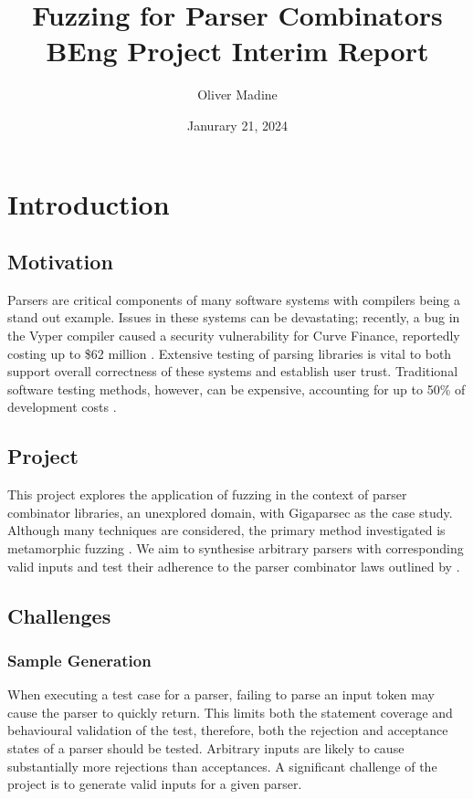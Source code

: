 \documentclass[11pt]{article}
\title{Fuzzing for Parser Combinators \\ {\large BEng Project Interim Report}}
\author{Oliver Madine}
\date{Janurary 21, 2024}
\let\oldciteauthor\citeauthor
\renewcommand{\citeauthor}[1]{\oldciteauthor{#1} \cite{#1}}
\begin{document}
\maketitle

\section{Introduction}

\subsection{Motivation}
Parsers are critical components of many software systems with compilers being a stand out example. Issues in these systems can be devastating; recently, a bug in the Vyper compiler caused a security vulnerability for Curve Finance, reportedly costing up to \$62 million \cite{curve}. Extensive testing of parsing libraries is vital to both support overall correctness of these systems and establish user trust. Traditional software testing methods, however, can be expensive, accounting for up to 50\% of development costs \cite{quickcheck}.

\subsection{Project}
This project explores the application of fuzzing in the context of parser combinator libraries, an unexplored domain, with Gigaparsec \cite{gigaparsec} as the case study. Although many techniques are considered, the primary method investigated is metamorphic fuzzing \cite{metamorphic}. We aim to synthesise arbitrary parsers with corresponding valid inputs and test their adherence to the parser combinator laws outlined by \citeauthor{parsley}.

\subsection{Challenges}

\subsubsection{Sample Generation}
When executing a test case for a parser, failing to parse an input token may cause the parser to quickly return. This limits both the statement coverage and behavioural validation of the test, therefore, both the rejection and acceptance states of a parser should be tested. Arbitrary inputs are likely to cause substantially more rejections than acceptances. A significant challenge of the project is to generate valid inputs for a given parser. 
\end{document}
